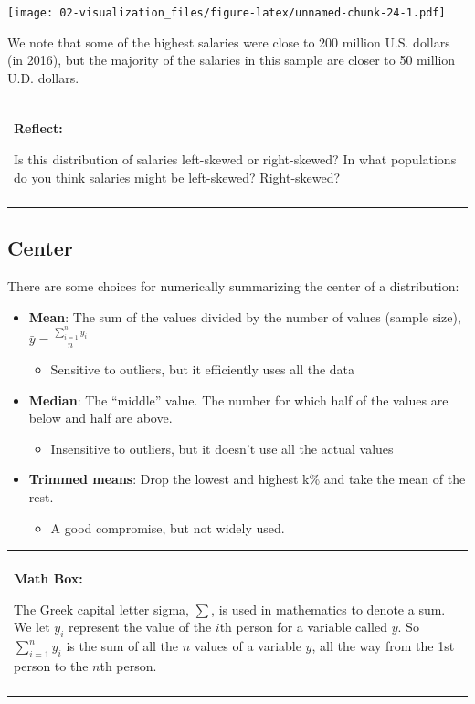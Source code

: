 \documentclass[
]{book}
\providecommand{\tightlist}{%
  \setlength{\itemsep}{0pt}\setlength{\parskip}{0pt}}
\newenvironment{reflect}
{
    \begin{center}
    
    \begin{tabular}{|p{0.8\textwidth}|}
    \rowcolor{LightBlue}
    \hline\\
    \rowcolor{LightBlue}
    \textbf{Reflect:}
}
{
    \\\rowcolor{LightBlue}
    \\\hline
    \end{tabular} 
    \end{center}
}
\newenvironment{mathbox}
{
    \begin{center}
    
    \begin{tabular}{|p{0.8\textwidth}|}
    \rowcolor{LightYellow}
    \hline\\
    \rowcolor{LightYellow}
    \textbf{Math Box:}
}
{
    \\\rowcolor{LightYellow}
    \\\hline
    \end{tabular} 
    \end{center}
}
\begin{document}
\texttt{[image: 02-visualization\_files/figure-latex/unnamed-chunk-24-1.pdf]}

We note that some of the highest salaries were close to 200 million U.S. dollars (in 2016), but the majority of the salaries in this sample are closer to 50 million U.D. dollars.

\begin{reflect}
Is this distribution of salaries left-skewed or right-skewed? In what
populations do you think salaries might be left-skewed? Right-skewed?
\end{reflect}

\hypertarget{center}{%
\subsection{Center}\label{center}}

There are some choices for numerically summarizing the center of a distribution:

\begin{itemize}
\tightlist
\item
  \textbf{Mean}: The sum of the values divided by the number of values (sample size), \(\bar{y} = \frac{\sum^n_{i=1}y_i}{n}\)

  \begin{itemize}
  \tightlist
  \item
    Sensitive to outliers, but it efficiently uses all the data
  \end{itemize}
\item
  \textbf{Median}: The ``middle'' value. The number for which half of the values are below and half are above.

  \begin{itemize}
  \tightlist
  \item
    Insensitive to outliers, but it doesn't use all the actual values
  \end{itemize}
\item
  \textbf{Trimmed means}: Drop the lowest and highest k\% and take the mean of the rest.

  \begin{itemize}
  \tightlist
  \item
    A good compromise, but not widely used.
  \end{itemize}
\end{itemize}

\begin{mathbox}
The Greek capital letter sigma, \(\sum\), is used in mathematics to
denote a sum. We let \(y_i\) represent the value of the \(i\)th person
for a variable called \(y\). So \(\sum^n_{i=1}y_i\) is the sum of all
the \(n\) values of a variable \(y\), all the way from the 1st person to
the \(n\)th person.
\end{mathbox}
\end{document}
